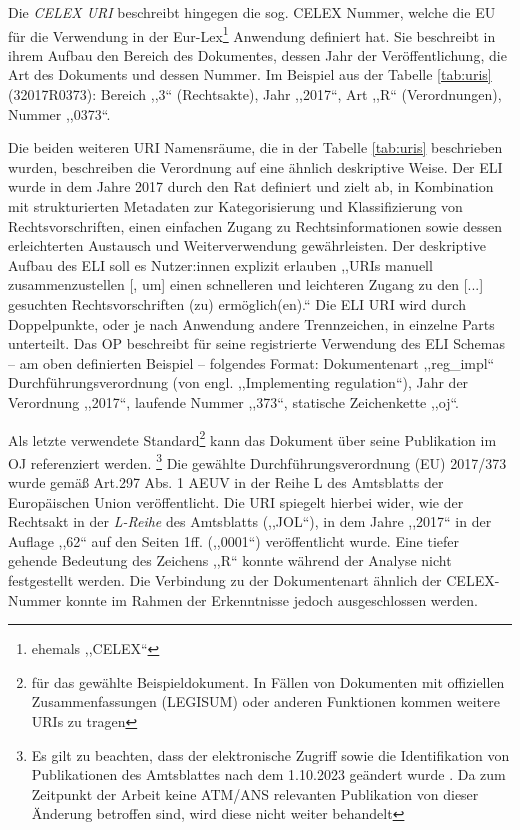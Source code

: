 Die \textit{CELEX URI} beschreibt hingegen die sog. CELEX Nummer, welche die EU für die Verwendung in der Eur-Lex\footnote{ehemals ,,CELEX``} Anwendung definiert hat.
Sie beschreibt in ihrem Aufbau den Bereich des Dokumentes, dessen Jahr der Veröffentlichung, die Art des Dokuments und dessen Nummer. \cite[2, 24]{eu_celex}
Im Beispiel aus der Tabelle \ref{tab:uris} (32017R0373): Bereich ,,3`` (Rechtsakte), Jahr ,,2017``, Art ,,R`` (Verordnungen), Nummer ,,0373``.

Die beiden weiteren URI Namensräume, die in der Tabelle \ref{tab:uris} beschrieben wurden, beschreiben die Verordnung auf eine ähnlich deskriptive Weise.
Der \acf{ELI} wurde in dem Jahre 2017 durch den Rat definiert und zielt ab, in Kombination mit strukturierten Metadaten zur Kategorisierung und Klassifizierung von Rechtsvorschriften, einen einfachen Zugang zu Rechtsinformationen sowie dessen erleichterten Austausch und Weiterverwendung gewährleisten. \cite[Art. 5]{52017XG1222}
Der deskriptive Aufbau des \ac{ELI} soll es Nutzer:innen explizit erlauben ,,\acp{URI} manuell zusammenzustellen [, um] einen schnelleren und leichteren Zugang zu den [...] gesuchten Rechtsvorschriften (zu) ermöglich(en).``\cite[Art. 6c]{52017XG1222}
Die \ac{ELI} \ac{URI} wird durch Doppelpunkte, oder je nach Anwendung andere Trennzeichen, in einzelne Parts unterteilt.
Das \acf{OP} beschreibt für seine registrierte Verwendung des ELI Schemas -- am oben definierten Beispiel -- folgendes Format: 
Dokumentenart ,,reg\_impl`` Durchführungsverordnung (von engl. ,,Implementing regulation``), Jahr der Verordnung ,,2017``,  laufende Nummer ,,373``, statische Zeichenkette ,,oj``. \cite[vgl.][]{eu_op_eli_register}

Als letzte verwendete Standard\footnote{für das gewählte Beispieldokument. In Fällen von Dokumenten mit offiziellen Zusammenfassungen (LEGISUM) oder anderen Funktionen kommen weitere \acp{URI} zu tragen} kann das Dokument über seine Publikation im \acf{OJ} referenziert werden. \footnote{Es gilt zu beachten, dass der elektronische Zugriff sowie die Identifikation von Publikationen des Amtsblattes nach dem 1.10.2023 geändert wurde \cite[siehe][]{eu_oj_actbyact}. Da zum Zeitpunkt der Arbeit keine ATM/ANS relevanten Publikation von dieser Änderung betroffen sind, wird diese nicht weiter behandelt}
Die gewählte Durchführungsverordnung (EU) 2017/373 wurde gemäß Art.297 Abs. 1 \ac{AEUV} in der Reihe L des Amtsblatts der Europäischen Union veröffentlicht. 
Die \ac{URI} spiegelt hierbei wider, wie der Rechtsakt in der \textit{L-Reihe} des Amtsblatts (,,JOL``), in dem Jahre ,,2017`` in der Auflage ,,62`` auf den Seiten 1ff. (,,0001``) veröffentlicht wurde.
Eine tiefer gehende Bedeutung des Zeichens ,,R`` konnte während der Analyse nicht festgestellt werden.
Die Verbindung zu der Dokumentenart ähnlich der CELEX-Nummer konnte im Rahmen der Erkenntnisse jedoch ausgeschlossen werden. 

